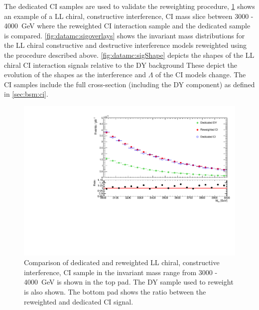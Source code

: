 The dedicated CI samples are used to validate the reweighting procedure, \cref{fig:datamc:sigValidate} shows an example of a LL chiral, constructive interference, CI mass slice between 3000 - \SI{4000}{\giga\electronvolt} where the reweighted CI interaction sample and the dedicated sample is compared. \cref{fig:datamc:sigoverlays} shows the invariant mass distributions for the LL chiral constructive and destructive interference models reweighted using the procedure described above. \cref{fig:datamc:sigShape} depicts the shapes of the LL chiral CI interaction signals relative to the DY background These depict the evolution of the shapes as the interference and $\Lambda$ of the CI models change. The CI samples include the full cross-section (including the DY component) as defined in \cref{sec:bsm:ci}.

\begin{figure}[h]
    \centering
    \includegraphics[width=\mediumfigwidth]{figures/analysis/datamc/sigmodel/CICompare.pdf}
    \caption[Validation of signal reweighting]{Comparison of dedicated and reweighted LL chiral, constructive interference, CI sample in the invariant mass range from 3000 - \SI{4000}{\giga\electronvolt} is shown in the top pad. The DY sample used to reweight is also shown. The bottom pad shows the ratio between the reweighted and dedicated CI signal.}
    \label{fig:datamc:sigValidate}
\end{figure}

